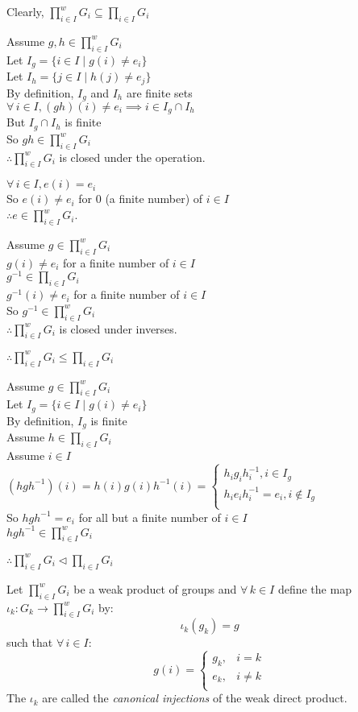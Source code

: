 \documentclass[letterpaper,12pt,fleqn]{article}
\newcommand{\direct}{\prod_{i\in I}G_i}
\newcommand{\iweak}{\prod_{i\in I}^wG_i}
\renewcommand{\i}{\iota}
\newcommand{\n}{\triangleleft}
\begin{document}
\begin{theproof}
  Clearly, $\iweak\subseteq\direct$

  Assume $g,h\in\iweak$ \\
  Let $I_g=\{i\in I\mid g(i)\ne e_i\}$ \\
  Let $I_h=\{j\in I\mid h(j)\ne e_j\}$ \\
  By definition, $I_g$ and $I_h$ are finite sets \\
  $\forall\,i\in I,(gh)(i)\ne e_i\implies i\in I_g\cap I_h$ \\
  But $I_g\cap I_h$ is finite \\
  So $gh\in\iweak$ \\
  $\therefore\iweak$ is closed under the operation.

  $\forall\,i\in I, e(i)=e_i$ \\
  So $e(i)\ne e_i$ for 0 (a finite number) of $i\in I$ \\
  $\therefore e\in\iweak$.

  Assume $g\in\iweak$ \\
  $g(i)\ne e_i$ for a finite number of $i\in I$ \\
  $g^{-1}\in\direct$ \\
  $g^{-1}(i)\ne e_i$ for a finite number of $i\in I$ \\
  So $g^{-1}\in\iweak$ \\
  $\therefore\iweak$ is closed under inverses.

  $\therefore\iweak\le\direct$

  Assume $g\in\iweak$ \\
  Let $I_g=\{i\in I\mid g(i)\ne e_i\}$ \\
  By definition, $I_g$ is finite \\
  Assume $h\in\direct$ \\
  Assume $i\in I$ \\
  $(hgh^{-1})(i)=h(i)g(i)h^{-1}(i)=\begin{cases}
  h_ig_ih_i^{-1}, i\in I_g \\
  h_ie_ih_i^{-1}=e_i, i\notin I_g \\
  \end{cases}$ \\
  So $hgh^{-1}=e_i$ for all but a finite number of $i\in I$ \\
  $hgh^{-1}\in\iweak$
  
  $\therefore\iweak\n\direct$
\end{theproof}

\begin{definition}
  Let $\iweak$ be a weak product of groups and $\forall\,k\in I$ define the map
  $\i_k:G_k\to\iweak$ by:
  \[\i_k(g_k)=g\]
  such that $\forall\,i\in I$:
  \[g(i)=\begin{cases}
  g_k, & i=k \\
  e_k, & i\ne k \\
  \end{cases}\]
  The $\i_k$ are called the \emph{canonical injections} of the weak direct
  product.
\end{definition}
\end{document}
